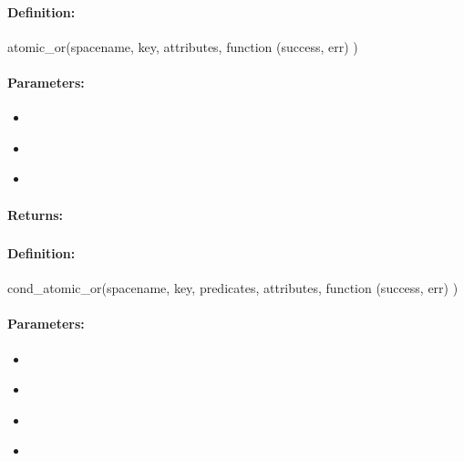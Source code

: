 \paragraph{Definition:}
\begin{javascriptcode}
atomic_or(spacename, key, attributes, function (success, err) {})
\end{javascriptcode}
\paragraph{Parameters:}
\begin{itemize}[noitemsep]
\item {}\\

\item {}\\

\item {}\\

\end{itemize}

\paragraph{Returns:}


\pagebreak
\subsubsection{}
\label{api:nodejs:cond_atomic_or}


\paragraph{Definition:}
\begin{javascriptcode}
cond_atomic_or(spacename, key, predicates, attributes, function (success, err) {})
\end{javascriptcode}
\paragraph{Parameters:}
\begin{itemize}[noitemsep]
\item {}\\

\item {}\\

\item {}\\

\item {}\\

\end{itemize}

